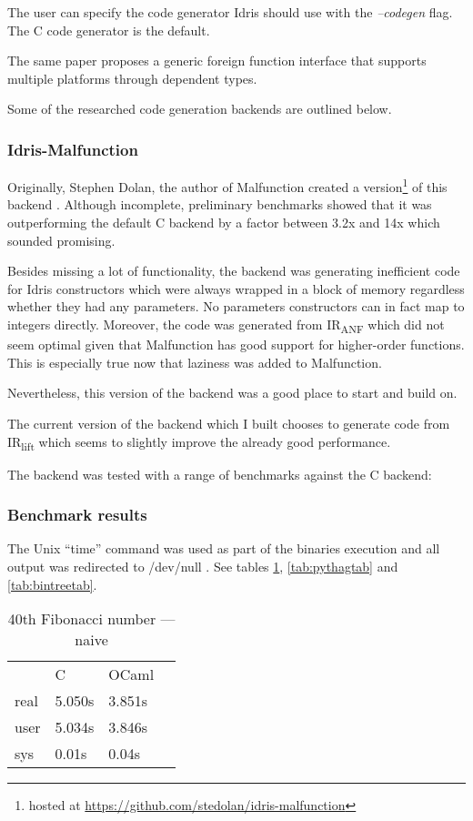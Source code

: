 The user can specify the code generator Idris should use with
the \emph{--codegen} flag.
The C code generator is the default.

The same paper proposes a generic foreign function interface that
supports multiple platforms through dependent types.

Some of the researched code generation backends are outlined
below.

\subsubsection{Idris-Malfunction}

Originally, Stephen Dolan, the author of Malfunction created a
version\footnote{hosted at
    \url{https://github.com/stedolan/idris-malfunction}}
of this backend \citep{dolan2016malfunctional}.
Although incomplete, preliminary benchmarks showed that it was
outperforming the default C backend by a factor between 3.2x and 14x
which sounded promising.

Besides missing a lot of functionality, the backend was generating
inefficient code for Idris constructors which were always wrapped
in a block of memory regardless whether they had any parameters.
No parameters constructors can in fact map to integers directly.
Moreover, the code was generated from IR\textsubscript{ANF}
which did not seem optimal given that Malfunction has
good support for higher-order functions.
This is especially true now that laziness was added to Malfunction.

Nevertheless, this version of the backend was a good place to start
and build on.

The current version of the backend which I built chooses
to generate code from IR\textsubscript{lift} which seems to
slightly improve the already good performance.

The backend was tested with a range of benchmarks against the
C backend:

\subsubsection{Benchmark results}
The Unix ``time'' command was used as part of the binaries execution
and all output was redirected to /dev/null \citep{self}.
See tables \hyperref[tab:fibtab]{\ref{tab:fibtab}},
\hyperref[tab:pythagtab]{\ref{tab:pythagtab}} and
\hyperref[tab:bintreetab]{\ref{tab:bintreetab}}.

\begin{table}
    \centering
    \caption{40th Fibonacci number --- naive}
    \begin{tabular}{llll}\label{tab:fibtab}
             & C      & OCaml  & \\
        real & 5.050s & 3.851s & \\
        user & 5.034s & 3.846s & \\
        sys  & 0.01s  & 0.04s  &
    \end{tabular}
\end{table}

